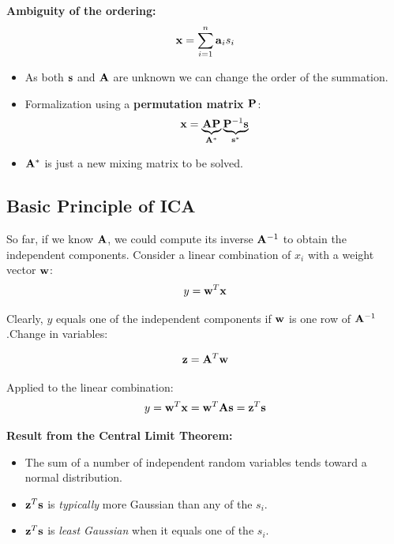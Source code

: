  \textbf        {Ambiguity of the ordering:}
  \begin{displaymath}
    \bm{\mathrm{x}} = \sum_{i=1}^n \bm{\mathrm{a}}_i s_i
  \end{displaymath}
  \begin{itemize}
    \item As both $\bm{\mathrm{s}}$ and $\mathbf{A}$ are unknown we can change the order of the summation.            
    \item Formalization using a \textbf        {permutation matrix $\mathbf{P}$}:
      \begin{displaymath}
        \bm{\mathrm{x}} = \underbrace{\mathbf{A} \mathbf{P}}_{\mathbf{A}^{\ast}} \underbrace{\mathbf{P}^{-1} \bm{\mathrm{s}}}_{\bm{\mathrm{s}}^{\ast}}            
      \end{displaymath}
    \item $\mathbf{A}^{\ast}$ is just a new mixing matrix to be solved.
  \end{itemize}
 
\subsection{Basic Principle of ICA}

  So far, if we know $\mathbf{A}$, we could compute its inverse $\mathbf{A}^{-1}$ to obtain the independent components. Consider a linear combination of $x_i$ with a weight vector $\bm{\mathrm{w}}$:
  \begin{displaymath}
    y = \bm{\mathrm{w}}^T \bm{\mathrm{x}}
  \end{displaymath}
  \vspace{0.5\baselineskip}

  Clearly, $y$ equals one of the independent components if $\bm{\mathrm{w}}$ is one row of $\mathbf{A}^{-1}$.Change in variables:

  \begin{displaymath}
    \bm{\mathrm{z}} = \mathbf{A}^T \bm{\mathrm{w}}
  \end{displaymath}
  
  Applied to the linear combination:
 \begin{displaymath}
    y = \bm{\mathrm{w}}^T \bm{\mathrm{x}} = \bm{\mathrm{w}}^T \mathbf{A} \bm{\mathrm{s}} = \bm{\mathrm{z}}^T \bm{\mathrm{s}}
  \end{displaymath}
 
 \textbf{Result from the Central Limit Theorem:}

  \begin{itemize}
    \item The sum of a number of independent random variables tends toward a normal distribution.
    \item $\bm{\mathrm{z}}^T \bm{\mathrm{s}}$ is \textit{typically} more Gaussian than any of the $s_i$.
    \item $\bm{\mathrm{z}}^T \bm{\mathrm{s}}$ is \textit{least Gaussian} when it equals one of the $s_i$.
  \end{itemize}
 
